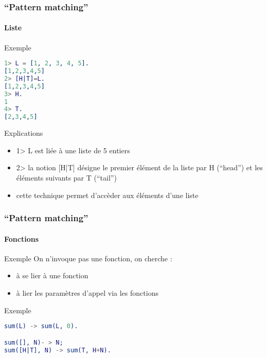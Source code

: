 \begin{frame}[fragile]
  \frametitle{``Pattern matching''}
  \framesubtitle{Liste}

  \begin{exampleblock}{Exemple}
    \begin{lstlisting}[language=erlang]
1> L = [1, 2, 3, 4, 5].
[1,2,3,4,5]
2> [H|T]=L.
[1,2,3,4,5]
3> H.
1
4> T.
[2,3,4,5]
    \end{lstlisting}
  \end{exampleblock}

  \begin{alertblock}{Explications}
    \begin{itemize}
    \item 1> L est liée à une liste de 5 entiers
    \item 2> la notion [H|T] désigne le premier élément de la liste par H
      (``head'') et les éléments suivants par T (``tail'')
    \item cette technique permet d'accèder aux éléments d'une liste
    \end{itemize}
  \end{alertblock}

\end{frame}

\begin{frame}[fragile]
  \frametitle{``Pattern matching''}
  \framesubtitle{Fonctions}

  \begin{block}{Exemple}
    On n'invoque pas une fonction, on cherche :
    \begin{itemize}
    \item à se lier à une fonction
    \item à lier les paramètres d'appel via les fonctions
    \end{itemize}
  \end{block}

  \begin{exampleblock}{Exemple}
    \begin{lstlisting}[language=erlang]
sum(L) -> sum(L, 0).

sum([], N)- > N;
sum([H|T], N) -> sum(T, H+N).
    \end{lstlisting}
  \end{exampleblock}

\end{frame}

